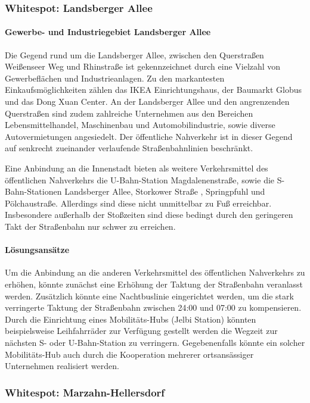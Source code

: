 \subsubsection{Whitespot: Landsberger Allee}
\paragraph{Gewerbe- und Industriegebiet Landsberger Allee}
Die Gegend rund um die Landsberger Allee, zwischen den Querstraßen Weißenseer Weg und Rhinstraße ist gekennzeichnet durch eine Vielzahl von Gewerbeflächen und Industrieanlagen. Zu den markantesten Einkaufsmöglichkeiten zählen das IKEA Einrichtungshaus, der Baumarkt Globus und das Dong Xuan Center. An der Landsberger Allee und den angrenzenden Querstraßen sind zudem zahlreiche Unternehmen aus den Bereichen Lebensmittelhandel, Maschinenbau und Automobilindustrie, sowie diverse Autovermietungen angesiedelt. Der öffentliche Nahverkehr ist in dieser Gegend auf senkrecht zueinander verlaufende Straßenbahnlinien beschränkt.

Eine Anbindung an die Innenstadt bieten als weitere Verkehrsmittel des öffentlichen Nahverkehrs die U-Bahn-Station Magdalenenstraße, sowie die S-Bahn-Stationen Landsberger Allee, Storkower Straße , Springpfuhl und Pölchaustraße. Allerdings sind diese nicht unmittelbar zu Fuß erreichbar. Insbesondere außerhalb der Stoßzeiten sind diese bedingt durch den geringeren Takt der Straßenbahn nur schwer zu erreichen.

\paragraph{Lösungsansätze}
Um die Anbindung an die anderen Verkehrsmittel des öffentlichen Nahverkehrs zu erhöhen, könnte zunächst eine Erhöhung der Taktung der Straßenbahn veranlasst werden. Zusätzlich könnte eine Nachtbuslinie eingerichtet werden, um die stark verringerte Taktung der Straßenbahn zwischen 24:00 und 07:00 zu kompensieren. Durch die Einrichtung eines Mobilitäts-Hubs (Jelbi Station) könnten beispielsweise Leihfahrräder zur Verfügung gestellt werden die Wegzeit zur nächsten S- oder U-Bahn-Station zu verringern. Gegebenenfalls könnte ein solcher Mobilitäts-Hub auch durch die Kooperation mehrerer ortsansässiger Unternehmen realisiert werden.










\subsubsection{Whitespot: Marzahn-Hellersdorf}
